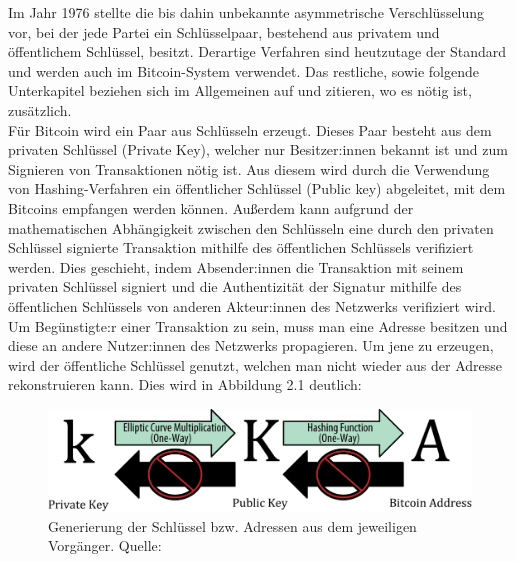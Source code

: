 Im Jahr 1976 stellte \cite{diffie_hellman_1976} die bis dahin unbekannte asymmetrische Verschlüsselung vor, bei der jede Partei ein Schlüsselpaar, bestehend aus privatem und öffentlichem Schlüssel, besitzt. 
Derartige Verfahren sind heutzutage der Standard und werden auch im Bitcoin-System verwendet. Das restliche, sowie folgende Unterkapitel beziehen sich im Allgemeinen auf \cite{antanopoulos_2014} und zitieren, wo es nötig ist, zusätzlich.\\

Für Bitcoin wird ein Paar aus Schlüsseln erzeugt. 
Dieses Paar besteht aus dem privaten Schlüssel (Private Key), welcher nur Besitzer:innen bekannt ist und zum Signieren von Transaktionen nötig ist.
Aus diesem wird durch die Verwendung von Hashing-Verfahren ein öffentlicher Schlüssel (Public key) abgeleitet, mit dem Bitcoins empfangen werden können.
Außerdem kann aufgrund der mathematischen Abhängigkeit zwischen den Schlüsseln eine durch den privaten Schlüssel signierte Transaktion mithilfe des öffentlichen Schlüssels verifiziert werden. Dies geschieht, indem Absender:innen die Transaktion mit seinem privaten Schlüssel signiert und die Authentizität der Signatur mithilfe des öffentlichen Schlüssels von anderen Akteur:innen des Netzwerks verifiziert wird. Um Begünstigte:r einer Transaktion zu sein, muss man eine Adresse besitzen und diese an andere Nutzer:innen des Netzwerks propagieren. Um jene zu erzeugen, wird der öffentliche Schlüssel genutzt, welchen man nicht wieder aus der Adresse rekonstruieren kann. Dies wird in Abbildung 2.1 deutlich:
\begin{figure}[htpb]
	\centering
	\includegraphics[width=\textwidth]{images/public_and_private_key.png}
	\caption{Generierung der Schlüssel bzw. Adressen aus dem jeweiligen Vorgänger. 
	Quelle: \cite[S. 57]{antanopoulos_2014}}
	\label{6braun:fig:keys}
\end{figure}
